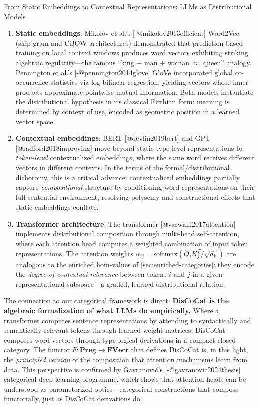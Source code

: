 \documentclass[
  ignorenonframetext,
]{beamer}
\begin{document}
\begin{frame}{From Static Embeddings to Contextual Representations: LLMs
as Distributional Models}
\begin{enumerate}
\item
  \textbf{Static embeddings}: Mikolov et al.'s
  {[}-@mikolov2013efficient{]} Word2Vec (skip-gram and CBOW
  architectures) demonstrated that prediction-based training on local
  context windows produces word vectors exhibiting striking algebraic
  regularity---the famous ``king \(-\) man \(+\) woman \(\approx\)
  queen'' analogy. Pennington et al.'s {[}-@pennington2014glove{]} GloVe
  incorporated global co-occurrence statistics via log-bilinear
  regression, yielding vectors whose inner products approximate
  pointwise mutual information. Both models instantiate the
  distributional hypothesis in its classical Firthian form: meaning is
  determined by context of use, encoded as geometric position in a
  learned vector space.
\item
  \textbf{Contextual embeddings}: BERT {[}@devlin2019bert{]} and GPT
  {[}@radford2018improving{]} move beyond static type-level
  representations to \emph{token-level} contextualized embeddings, where
  the same word receives different vectors in different contexts. In the
  terms of the formal/distributional dichotomy, this is a critical
  advance: contextualized embeddings partially capture
  \emph{compositional} structure by conditioning word representations on
  their full sentential environment, resolving polysemy and
  constructional effects that static embeddings conflate.
\item
  \textbf{Transformer architecture}: The transformer
  {[}@vaswani2017attention{]} implements distributional composition
  through multi-head self-attention, where each attention head computes
  a weighted combination of input token representations. The attention
  weights \(\alpha_{ij} = \text{softmax}(Q_i K_j^T / \sqrt{d_k})\) are
  analogous to the enriched hom-values of
  \autoref{sec:enriched-categories}: they encode the \emph{degree of
  contextual relevance} between tokens \(i\) and \(j\) in a given
  representational subspace---a graded, learned distributional relation.
\end{enumerate}

The connection to our categorical framework is direct: \textbf{DisCoCat
is the algebraic formalization of what LLMs do empirically.} Where a
transformer computes sentence representations by attending to
syntactically and semantically relevant tokens through learned weight
matrices, DisCoCat composes word vectors through type-logical
derivations in a compact closed category. The functor
\(F: \mathbf{Preg} \to \mathbf{FVect}\) that defines DisCoCat is, in
this light, the \emph{principled version} of the composition that
attention mechanisms learn from data. This perspective is confirmed by
Gavranović's {[}-@gavranovic2024thesis{]} categorical deep learning
programme, which shows that attention heads can be understood as
parameterized optics---categorical constructions that compose
functorially, just as DisCoCat derivations do.


\end{frame}
\end{document}
